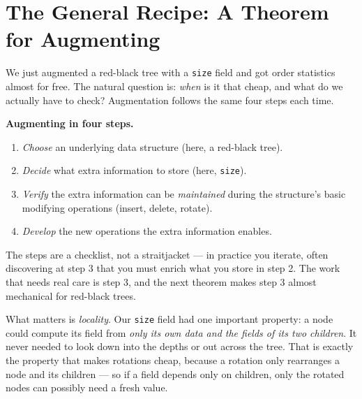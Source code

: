 \section{The General Recipe: A Theorem for Augmenting}

We just augmented a red-black tree with a \texttt{size} field and got order
statistics almost for free. The natural question is: \emph{when} is it that
cheap, and what do we actually have to check? Augmentation follows the same four
steps each time.

\begin{formalbox}
\textbf{Augmenting in four steps.}
\begin{enumerate}
  \item \emph{Choose} an underlying data structure (here, a red-black tree).
  \item \emph{Decide} what extra information to store (here, \texttt{size}).
  \item \emph{Verify} the extra information can be \emph{maintained} during the
    structure's basic modifying operations (insert, delete, rotate).
  \item \emph{Develop} the new operations the extra information enables.
\end{enumerate}
The steps are a checklist, not a straitjacket --- in practice you iterate, often
discovering at step 3 that you must enrich what you store in step 2. The work
that needs real care is step 3, and the next theorem makes step 3 almost
mechanical for red-black trees.
\end{formalbox}

What matters is \emph{locality}. Our \texttt{size} field had one important
property: a node could compute its field from \emph{only its own data and the
fields of its two children}. It never needed to look down into the depths or out
across the tree. That is exactly the property that makes rotations cheap, because
a rotation only rearranges a node and its children --- so if a field depends only
on children, only the rotated nodes can possibly need a fresh value.

